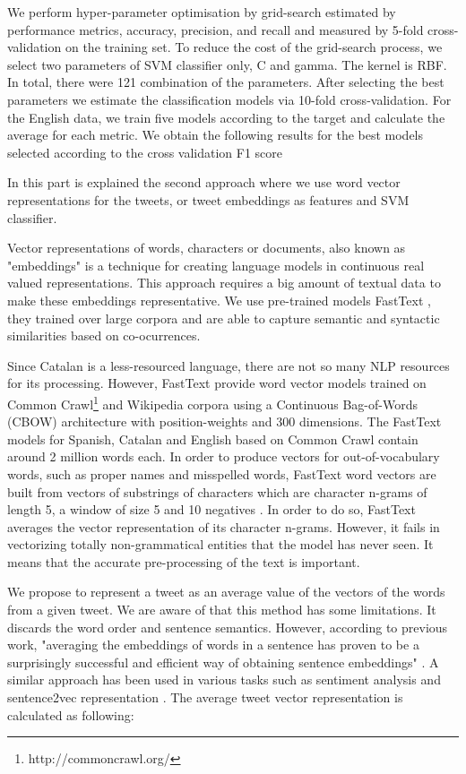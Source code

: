 \documentclass[10pt, a4paper]{article}
\begin{document}
We perform hyper-parameter optimisation by grid-search  estimated by performance metrics, accuracy, precision, and recall and measured by 5-fold cross-validation on the training set. To reduce the cost of the grid-search process, we select two parameters of SVM classifier only, C and gamma.  The kernel is RBF.  In total, there were 121 combination of the parameters. After  selecting  the  best  parameters  we  estimate  the  classification  models  via  10-fold
cross-validation.  For the English data, we train five models according to the target and calculate the average for each metric.  We obtain the following results for the best models selected according to the cross validation F1 score

In this part is explained the second approach where we use word vector representations for the tweets, or tweet embeddings as features and SVM classifier. 

Vector representations of words, characters or documents, also known as "embeddings" is a technique for creating language models in continuous real valued representations. This approach requires a big amount of textual data to make these embeddings representative. We use pre-trained models FastText \cite{joulin-etal-2017-bag}, they trained over large corpora and are able to capture semantic and syntactic similarities based on co-ocurrences.

Since Catalan is a less-resourced language, there are not so many NLP resources for its processing. However, FastText provide word vector models trained on Common Crawl\footnote{http://commoncrawl.org/} and Wikipedia corpora using a Continuous Bag-of-Words (CBOW) architecture with position-weights and 300 dimensions. The FastText models for Spanish, Catalan and English based on Common Crawl contain around 2 million words each. In order to produce vectors for out-of-vocabulary words, such as proper names and misspelled words, FastText word vectors are built from vectors of substrings of characters which are character n-grams of length 5, a window of size 5 and 10 negatives \cite{Grave18}. In order to do so, FastText averages the vector representation of its character n-grams. However, it fails in vectorizing totally non-grammatical entities that the model has never seen. It means that the accurate pre-processing of the text is important. 

We propose to represent a tweet as an average value of the vectors of the words from a given tweet. We are aware of that this method has some limitations. It discards the word order and sentence semantics. However, according to previous work, "averaging the embeddings of words in a sentence has proven to be a surprisingly successful and efficient way of obtaining sentence embeddings" \cite{DBLP:journals/corr/KenterBR16}. A similar approach has been used in various tasks such as sentiment analysis \cite{Anselmo17,socher-etal-2013-recursive} and sentence2vec representation \cite{Ben-Lhachemi18,DBLP:journals/corr/PagliardiniGJ17}. The average tweet vector representation is calculated as following: 
\end{document}
